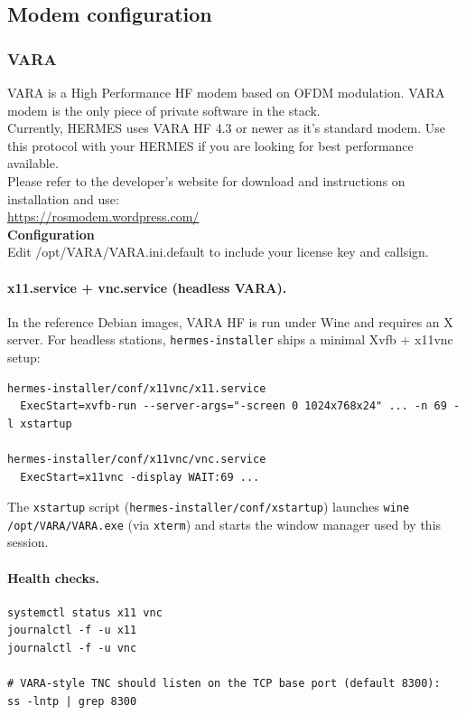 \subsection{Modem configuration}
\subsubsection{VARA}
VARA is a High Performance HF modem based on OFDM modulation.
VARA modem is the only piece of private software in the stack.\\
Currently, HERMES uses VARA HF 4.3 or newer as it's standard modem.
Use this protocol with your HERMES if you are looking for best performance available.\\

Please refer to the developer's website for download and instructions on installation and use: \\
\url{https://rosmodem.wordpress.com/}\\

\textbf{Configuration}\\
Edit /opt/VARA/VARA.ini.default to include your license key and callsign.

\paragraph{x11.service + vnc.service (headless VARA).} In the reference Debian images, VARA HF is run under Wine and requires an X server. For
headless stations, \verb|hermes-installer| ships a minimal Xvfb + x11vnc setup:
\begin{verbatim}
hermes-installer/conf/x11vnc/x11.service
  ExecStart=xvfb-run --server-args="-screen 0 1024x768x24" ... -n 69 -l xstartup

hermes-installer/conf/x11vnc/vnc.service
  ExecStart=x11vnc -display WAIT:69 ...
\end{verbatim}
The \verb|xstartup| script (\verb|hermes-installer/conf/xstartup|) launches \verb|wine /opt/VARA/VARA.exe| (via \verb|xterm|) and starts
the window manager used by this session.

\paragraph{Health checks.}
\begin{verbatim}
systemctl status x11 vnc
journalctl -f -u x11
journalctl -f -u vnc

# VARA-style TNC should listen on the TCP base port (default 8300):
ss -lntp | grep 8300
\end{verbatim}

